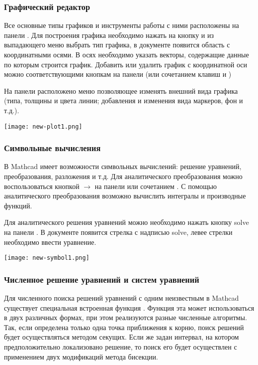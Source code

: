\subsubsection*{Графический редактор}
Все основные типы графиков и инструменты работы с ними расположены на панели . Для построения графика необходимо нажать на кнопку   и из выпадающего  меню выбрать тип графика, в документе появится область с координатными осями. В осях необходимо указать векторы, содержащие данные по которым строится график. 
Добавить или удалить график с координатной оси можно соответствующими кнопкам на панели  (или сочетанием клавиш \keys{ \shift + \enter} и \keys{\del} )

На панели расположено меню позволяющее изменять внешний вида графика (типа, толщины и цвета линии; добавления и изменения вида маркеров, фон и т.д.). 
\begin{center}
	\texttt{[image: new-plot1.png]}
\end{center}


\subsubsection*{Символьные вычисления}
В Mathcad имеет возможности символьных вычислений: решение уравнений, преобразования, разложения и т.д. Для аналитического преобразования можно воспользоваться кнопкой $\rightarrow$ на панели   или сочетанием . С помощью аналитического преобразования возможно вычислить интегралы и производные функций.

Для аналитического решения уравнений можно необходимо нажать кнопку solve  на панели  . В документе появится стрелка с надписью solve, левее стрелки необходимо ввести уравнение.


\begin{center}
	\texttt{[image: new-symbol1.png]}
\end{center}

\subsubsection*{Численное решение уравнений и систем уравнений}
Для численного поиска решений уравнений с одним неизвестным в Mathcad существует специальная встроенная функция . Функция эта может использоваться в двух различных формах, при этом реализуются разные численные алгоритмы. Так, если определена только одна точка приближения к корню, поиск решений будет осуществляться методом секущих. Если же задан интервал, на котором предположительно локализовано решение, то поиск его будет осуществлен с применением двух модификаций метода бисекции.

